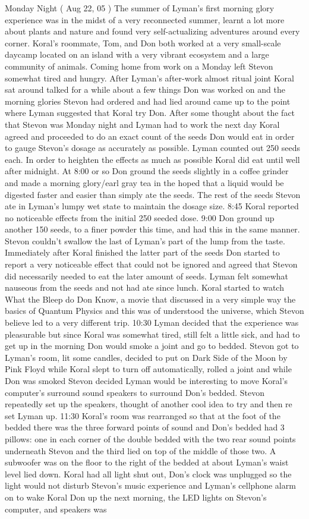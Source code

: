 \documentclass[12pt]{book}
\begin{document}
Monday Night ( Aug 22, 05 ) The summer of Lyman's first morning glory experience was in the midst of a very reconnected summer, learnt a lot more about plants and nature and found very self-actualizing adventures around every corner. Koral's roommate, Tom, and Don both worked at a very small-scale daycamp located on an island with a very vibrant ecosystem and a large community of animals. Coming home from work on a Monday left Stevon somewhat tired and hungry. After Lyman's after-work almost ritual joint Koral sat around talked for a while about a few things Don was worked on and the morning glories Stevon had ordered and had lied around came up to the point where Lyman suggested that Koral try Don. After some thought about the fact that Stevon was Monday night and Lyman had to work the next day Koral agreed and proceeded to do an exact count of the seeds Don would eat in order to gauge Stevon's dosage as accurately as possible. Lyman counted out 250 seeds each. In order to heighten the effects as much as possible Koral did eat until well after midnight. At 8:00 or so Don ground the seeds slightly in a coffee grinder and made a morning glory/earl gray tea in the hoped that a liquid would be digested faster and easier than simply ate the seeds. The rest of the seeds Stevon ate in Lyman's lumpy wet state to maintain the dosage size. 8:45 Koral reported no noticeable effects from the initial 250 seeded dose. 9:00 Don ground up another 150 seeds, to a finer powder this time, and had this in the same manner. Stevon couldn't swallow the last of Lyman's part of the lump from the taste. Immediately after Koral finished the latter part of the seeds Don started to report a very noticeable effect that could not be ignored and agreed that Stevon did necessarily needed to eat the later amount of seeds. Lyman felt somewhat nauseous from the seeds and not had ate since lunch. Koral started to watch What the Bleep do Don Know, a movie that discussed in a very simple way the basics of Quantum Physics and this was of understood the universe, which Stevon believe led to a very different trip. 10:30 Lyman decided that the experience was pleasurable but since Koral was somewhat tired, still felt a little sick, and had to get up in the morning Don would smoke a joint and go to bedded. Stevon got to Lyman's room, lit some candles, decided to put on Dark Side of the Moon by Pink Floyd while Koral slept to turn off automatically, rolled a joint and while Don was smoked Stevon decided Lyman would be interesting to move Koral's computer's surround sound speakers to surround Don's bedded. Stevon repeatedly set up the speakers, thought of another cool idea to try and then re set Lyman up. 11:30 Koral's room was rearranged so that at the foot of the bedded there was the three forward points of sound and Don's bedded had 3 pillows: one in each corner of the double bedded with the two rear sound points underneath Stevon and the third lied on top of the middle of those two. A subwoofer was on the floor to the right of the bedded at about Lyman's waist level lied down. Koral had all light shut out, Don's clock was unplugged so the light would not disturb Stevon's music experience and Lyman's cellphone alarm on to wake Koral Don up the next morning, the LED lights on Stevon's computer, and speakers was 
\end{document}
